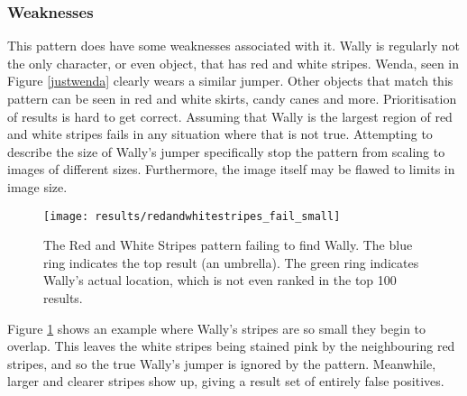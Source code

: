 \documentclass[../main.tex]{subfiles}
\begin{document}
    \subsubsection{Weaknesses}
      This pattern does have some weaknesses associated with it.
      Wally is regularly not the only character, or even object, that has red and white stripes.
      Wenda, seen in Figure \ref{justwenda} clearly wears a similar jumper.
      Other objects that match this pattern can be seen in red and white skirts, candy canes and more.
      Prioritisation of results is hard to get correct.
      Assuming that Wally is the largest region of red and white stripes fails in any situation where that is not true.
      Attempting to describe the size of Wally's jumper specifically stop the pattern from scaling to images of different sizes.
      Furthermore, the image itself may be flawed to limits in image size.
      \begin{figure}[h]
        \centering
        \texttt{[image: results/redandwhitestripes\_fail\_small]}
        \caption{
          The Red and White Stripes pattern failing to find Wally.
          The blue ring indicates the top result (an umbrella).
          The green ring indicates Wally's actual location, which is not even ranked in the top 100 results.
        }
        \label{rws_fail_small}
      \end{figure}
      Figure \ref{rws_fail_small} shows an example where Wally's stripes are so small they begin to overlap.
      This leaves the white stripes being stained pink by the neighbouring red stripes, and so the true Wally's jumper is ignored by the pattern.
      Meanwhile, larger and clearer stripes show up, giving a result set of entirely false positives.
\end{document}
